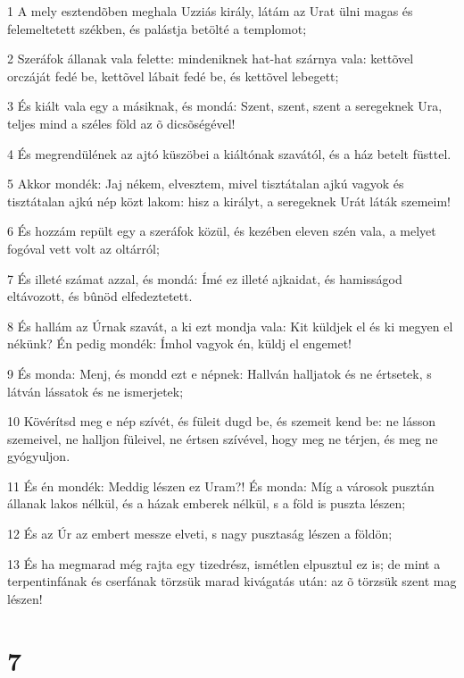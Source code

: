 \par 1 A mely esztendõben meghala Uzziás király, látám az Urat ülni magas és felemeltetett székben, és palástja betölté a templomot;
\par 2 Szeráfok állanak vala felette: mindeniknek hat-hat szárnya vala: kettõvel orczáját fedé be, kettõvel lábait fedé be, és kettõvel lebegett;
\par 3 És kiált vala egy a másiknak, és mondá: Szent, szent, szent a seregeknek Ura, teljes mind a széles föld az õ dicsõségével!
\par 4 És megrendülének az ajtó küszöbei a kiáltónak szavától, és a ház betelt füsttel.
\par 5 Akkor mondék: Jaj nékem, elvesztem, mivel tisztátalan ajkú vagyok és tisztátalan ajkú nép közt lakom: hisz a királyt, a seregeknek Urát láták szemeim!
\par 6 És hozzám repült egy a szeráfok közül, és kezében eleven szén vala, a melyet fogóval vett volt az oltárról;
\par 7 És illeté számat azzal, és mondá: Ímé ez illeté ajkaidat, és hamisságod eltávozott, és bûnöd elfedeztetett.
\par 8 És hallám az Úrnak szavát, a ki ezt mondja vala: Kit küldjek el és ki megyen el nékünk? Én pedig mondék: Ímhol vagyok én, küldj el engemet!
\par 9 És monda: Menj, és mondd ezt e népnek: Hallván halljatok és ne értsetek, s látván lássatok és ne ismerjetek;
\par 10 Kövérítsd meg e nép szívét, és füleit dugd be, és szemeit kend be: ne lásson szemeivel, ne halljon füleivel, ne értsen szívével, hogy meg ne térjen, és meg ne gyógyuljon.
\par 11 És én mondék: Meddig lészen ez Uram?! És monda: Míg a városok pusztán állanak lakos nélkül, és a házak emberek nélkül, s a föld is puszta lészen;
\par 12 És az Úr az embert messze elveti, s nagy pusztaság lészen a földön;
\par 13 És ha megmarad még rajta egy tizedrész, ismétlen elpusztul ez is; de mint a terpentinfának és cserfának törzsük marad kivágatás után: az õ törzsük szent mag lészen!

\chapter{7}


